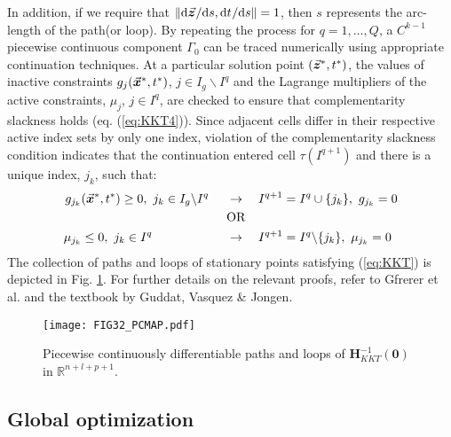 In addition, if we require that
$\Vert \text{d}\vec{\bm{z}}^{}/\text{d}s,\text{d}t^{}/\text{d}s\Vert=1$, then $s$ 
represents the arc-length of the path(or loop). By repeating the process for 
$q=1,\dots,Q$, a $C^{k-1}$ piecewise continuous 
component $\mathit{\Gamma_0}$ can be traced numerically using appropriate 
continuation 
techniques. At a particular solution point $(\vec{\bm{z}}^*,t^*)$, 
the values of inactive constraints $g_j(\vec{\bm{x}}^*,t^*)$, $ j\in I_g\backslash 
I^q$ and the Lagrange
multipliers of the active constraints, $\mu_j$, $j\in I^q$,
are checked to ensure that complementarity slackness holds (eq.
(\ref{eq:KKT4})). Since adjacent cells differ in their respective active index
sets by only one index, violation of the complementarity slackness condition
indicates that the continuation entered cell $\tau(I^{q+1})$ and there is a
unique index, $j_k$, such that:
\begin{align*}
	g_{j_k}(\vec{\bm{x}}^*,t^*)\geq 0,\ j_k\in I_g\backslash I^q\hspace*{0.5cm} 
	&\rightarrow\quad
	I^{q+1}=I^q\cup\{j_k\},\ g_{j_k}=0\\
	&\text{OR}\\
	\mu_{j_k}\leq 0,\ j_k\in I^q \hspace*{2.1cm}&\rightarrow\quad 
	I^{q+1}=I^q\backslash\{j_k\},\
	\mu_{j_k}=0\\
\end{align*}
The collection of paths and loops of stationary points satisfying 
(\ref{eq:KKT}) is depicted in Fig. \ref{fig:FIG32}. For
further details on the relevant proofs, refer to
Gfrerer et al.\cite{Gfrerer:1985} and
the textbook by Guddat, Vasquez \& Jongen\cite{Guddat:1990}.
\begin{figure}[t]
	\centering
	\texttt{[image: FIG32\_PCMAP.pdf]}
	\caption{Piecewise continuously differentiable paths and loops of
		$\bm{H}_{KKT}^{-1}(\bm{0})$ in $\mathbb{R}^{n+l+p+1}$.}
	\label{fig:FIG32}
\end{figure}

\subsection{Global optimization}\label{CH4-S1SS4}

